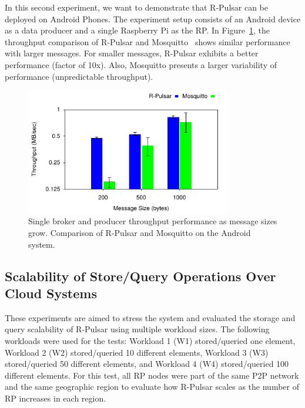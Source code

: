 In this second experiment, we want to demonstrate that R-Pulsar can be deployed on  Android Phones.  
The experiment setup consists of an Android device as a data producer and a single Raspberry Pi as the RP.
In Figure~\ref{fig:ProducerPhone}, the throughput comparison of R-Pulsar and Mosquitto~\cite{mosquitto} shows similar performance with larger messages. For smaller messages, R-Pulsar exhibits a better performance (factor of 10x). Also, Mosquitto presents a larger variability of performance (unpredictable throughput).

\begin{figure}[h!]
  \centering
  \includegraphics[width=0.8\textwidth]{Results/ProducerPhone}
  \caption{Single broker and producer throughput performance as message sizes grow. Comparison of R-Pulsar and Mosquitto on the Android system.}
  \label{fig:ProducerPhone}

\end{figure}

\subsection{Scalability of Store/Query Operations Over Cloud Systems}

These experiments are aimed to stress the system and evaluated the storage and query scalability of R-Pulsar using multiple workload sizes. The following workloads were used for the tests: Workload 1 (W1) stored/queried one element, Workload 2 (W2) stored/queried 10 different elements, Workload 3 (W3) stored/queried 50 different elements, and Workload 4 (W4) stored/queried 100 different elements. For this test, all RP nodes were part of the same P2P network and the same geographic region to evaluate how R-Pulsar scales as the number of RP increases in each region. 


